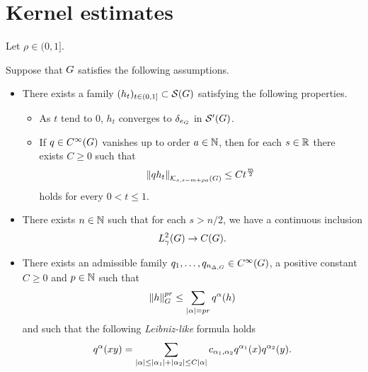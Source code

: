 \section{Kernel estimates}

\begin{theorem}
    Let $\rho \in (0, 1]$.

    Suppose that $\Group$ satisfies the following assumptions.
    \begin{itemize}
        \item
            There exists a family $(h_t)_{t \in (0, 1]} \subset \Schwartz \Group$
            satisfying the following properties.
            \begin{itemize}
                \item As $t$ tend to $0$, $h_t$ converges to $\delta_{e_\Group}$ in $\TemperedDistributions \Group$.
                \item If $q \in \SmoothFunctions {\Group}$ vanishes up to order $a \in \N$,
                    then for each $s \in \R$ there exists $C \geq 0$ such that
                    \begin{align}
                        \norm [\KernelsSobolev s {s - m + \rho a}] {q h_t}
                        \leq C t^{\frac m 2}
                        \label{eq:kernel_estimates:heat_kernel_condition}
                    \end{align}
                    holds for every $0 < t \leq 1$.
            \end{itemize}
        \item There exists $n \in \N$ such that for each $s > n/2$,
            we have a continuous inclusion
            \begin{align*}
                \Sobolev \gamma \to \ContinuousFunctions \Group.
            \end{align*}
        \item There exists an admissible family $q_1, \dots, q_{\dimDifferenceOperators} \in \SmoothFunctions \Group$, a positive constant $C \geq 0$ and $p \in \N$ such that
            \begin{align*}
                \norm [\Group] h^{p r} \leq \sum_{\abs \alpha = pr} q^\alpha(h)
            \end{align*}
            and such that the following \emph{Leibniz-like} formula holds
            \begin{align*}
                q^\alpha(x y) = \sum_{\abs \alpha \leq \abs {\alpha_1} + \abs {\alpha_2} \leq C \abs \alpha}
                c_{\alpha_1, \alpha_2} q^{\alpha_1}(x) q^{\alpha_2}(y).
            \end{align*}
    \end{itemize}


\end{theorem}
